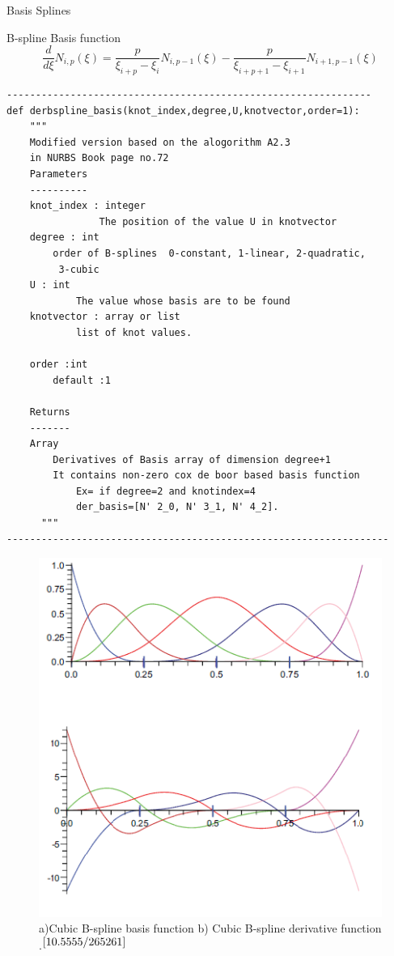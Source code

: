 \documentclass[a4paper,12pt,times]{article}
\begin{document}
\begin{section}{Basis Splines}
\begin{subsection}{B-spline Basis function}
\begin{equation}\label{B-spline Derivative}
\frac{d}{d \xi} N_{i, p}(\xi)=\frac{p}{\xi_{i+p}-\xi_{i}} N_{i, p-1}(\xi)-\frac{p}{\xi_{i+p+1}-\xi_{i+1}} N_{i+1, p-1}(\xi)
\end{equation}  
\begin{verbatim}
---------------------------------------------------------------
def derbspline_basis(knot_index,degree,U,knotvector,order=1):
    """
    Modified version based on the alogorithm A2.3 
    in NURBS Book page no.72
    Parameters
    ----------
    knot_index : integer
                The position of the value U in knotvector
    degree : int
        order of B-splines  0-constant, 1-linear, 2-quadratic,
         3-cubic
    U : int
            The value whose basis are to be found
    knotvector : array or list
            list of knot values.
            
	order :int 
		default :1
		
    Returns
    -------
    Array 
        Derivatives of Basis array of dimension degree+1
        It contains non-zero cox de boor based basis function
            Ex= if degree=2 and knotindex=4 
            der_basis=[N' 2_0, N' 3_1, N' 4_2].
      """
------------------------------------------------------------------
\end{verbatim}

\begin{figure}[h!]
\centering
\includegraphics[width=0.75\linewidth]{bspline_function_and_derivative_cubic.png}
\caption{a)Cubic B-spline basis function b) Cubic B-spline derivative function .$^{\cite{10.5555/265261}}$}
\label{fig:Cubic Bspline basis function and it's derivative}
\end{figure}


\end{subsection}
\end{section}
\end{document}
